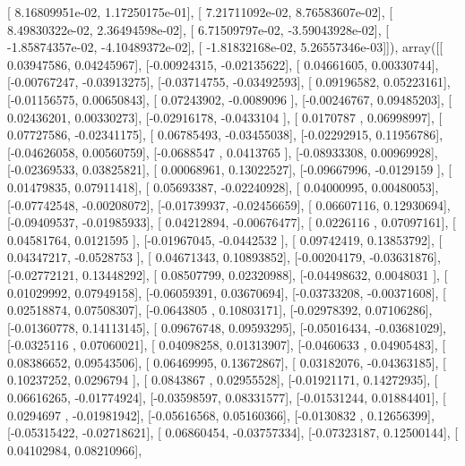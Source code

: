 \documentclass{article}
\begin{document}
       [  8.16809951e-02,   1.17250175e-01],
       [  7.21711092e-02,   8.76583607e-02],
       [  8.49830322e-02,   2.36494598e-02],
       [  6.71509797e-02,  -3.59043928e-02],
       [ -1.85874357e-02,  -4.10489372e-02],
       [ -1.81832168e-02,   5.26557346e-03]]), array([[ 0.03947586,  0.04245967],
       [-0.00924315, -0.02135622],
       [ 0.04661605,  0.00330744],
       [-0.00767247, -0.03913275],
       [-0.03714755, -0.03492593],
       [ 0.09196582,  0.05223161],
       [-0.01156575,  0.00650843],
       [ 0.07243902, -0.0089096 ],
       [-0.00246767,  0.09485203],
       [ 0.02436201,  0.00330273],
       [-0.02916178, -0.0433104 ],
       [ 0.0170787 ,  0.06998997],
       [ 0.07727586, -0.02341175],
       [ 0.06785493, -0.03455038],
       [-0.02292915,  0.11956786],
       [-0.04626058,  0.00560759],
       [-0.0688547 ,  0.0413765 ],
       [-0.08933308,  0.00969928],
       [-0.02369533,  0.03825821],
       [ 0.00068961,  0.13022527],
       [-0.09667996, -0.0129159 ],
       [ 0.01479835,  0.07911418],
       [ 0.05693387, -0.02240928],
       [ 0.04000995,  0.00480053],
       [-0.07742548, -0.00208072],
       [-0.01739937, -0.02456659],
       [ 0.06607116,  0.12930694],
       [-0.09409537, -0.01985933],
       [ 0.04212894, -0.00676477],
       [ 0.0226116 ,  0.07097161],
       [ 0.04581764,  0.0121595 ],
       [-0.01967045, -0.0442532 ],
       [ 0.09742419,  0.13853792],
       [ 0.04347217, -0.0528753 ],
       [ 0.04671343,  0.10893852],
       [-0.00204179, -0.03631876],
       [-0.02772121,  0.13448292],
       [ 0.08507799,  0.02320988],
       [-0.04498632,  0.0048031 ],
       [ 0.01029992,  0.07949158],
       [-0.06059391,  0.03670694],
       [-0.03733208, -0.00371608],
       [ 0.02518874,  0.07508307],
       [-0.0643805 ,  0.10803171],
       [-0.02978392,  0.07106286],
       [-0.01360778,  0.14113145],
       [ 0.09676748,  0.09593295],
       [-0.05016434, -0.03681029],
       [-0.0325116 ,  0.07060021],
       [ 0.04098258,  0.01313907],
       [-0.0460633 ,  0.04905483],
       [ 0.08386652,  0.09543506],
       [ 0.06469995,  0.13672867],
       [ 0.03182076, -0.04363185],
       [ 0.10237252,  0.0296794 ],
       [ 0.0843867 ,  0.02955528],
       [-0.01921171,  0.14272935],
       [ 0.06616265, -0.01774924],
       [-0.03598597,  0.08331577],
       [-0.01531244,  0.01884401],
       [ 0.0294697 , -0.01981942],
       [-0.05616568,  0.05160366],
       [-0.0130832 ,  0.12656399],
       [-0.05315422, -0.02718621],
       [ 0.06860454, -0.03757334],
       [-0.07323187,  0.12500144],
       [ 0.04102984,  0.08210966],
\end{document}
